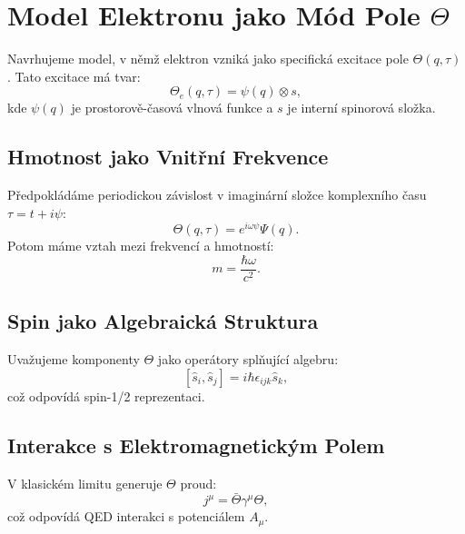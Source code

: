 \documentclass{article}
\begin{document}
\section*{Model Elektronu jako Mód Pole \(\Theta\)}

Navrhujeme model, v němž elektron vzniká jako specifická excitace pole \(\Theta(q, \tau)\). Tato excitace má tvar:
\[
\Theta_e(q, \tau) = \psi(q) \otimes s,
\]
kde \(\psi(q)\) je prostorově-časová vlnová funkce a \(s\) je interní spinorová složka.

\subsection*{Hmotnost jako Vnitřní Frekvence}
Předpokládáme periodickou závislost v imaginární složce komplexního času \(\tau = t + i\psi\):
\[
\Theta(q, \tau) = e^{i\omega \psi} \Psi(q).
\]
Potom máme vztah mezi frekvencí a hmotností:
\[
m = \frac{\hbar \omega}{c^2}.
\]

\subsection*{Spin jako Algebraická Struktura}
Uvažujeme komponenty \(\Theta\) jako operátory splňující algebru:
\[
[\hat{s}_i, \hat{s}_j] = i \hbar \epsilon_{ijk} \hat{s}_k,
\]
což odpovídá spin-1/2 reprezentaci.

\subsection*{Interakce s Elektromagnetickým Polem}
V klasickém limitu generuje \(\Theta\) proud:
\[
j^\mu = \bar{\Theta} \gamma^\mu \Theta,
\]
což odpovídá QED interakci s potenciálem \(A_\mu\).
\end{document}
